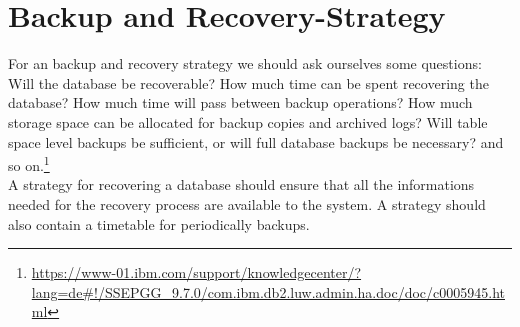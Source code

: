 \documentclass{vldb}
\begin{document}
\section{Backup and Recovery-Strategy}
For an backup and recovery strategy we should ask ourselves some questions:\\
Will the database be recoverable?
How much time can be spent recovering the database?
How much time will pass between backup operations?
How much storage space can be allocated for backup copies and archived logs?
Will table space level backups be sufficient, or will full database backups be necessary? and so on.\footnote{\url{https://www-01.ibm.com/support/knowledgecenter/?lang=de#!/SSEPGG_9.7.0/com.ibm.db2.luw.admin.ha.doc/doc/c0005945.html}}\\
A strategy for recovering a database should ensure that all the informations needed for the recovery process are available to the system. A strategy should also contain a timetable for periodically backups.
\end{document}
